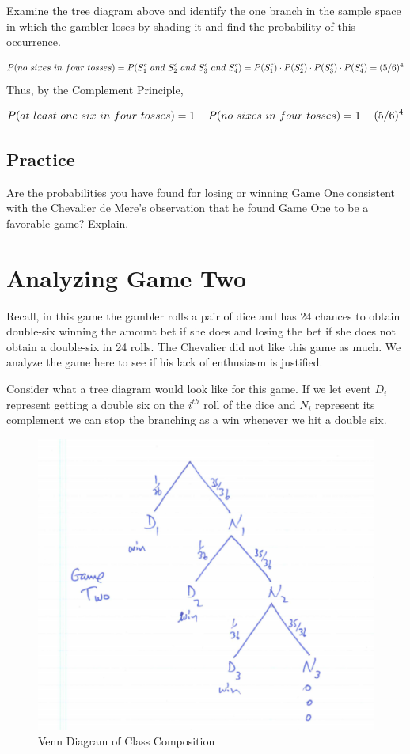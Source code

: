 \documentclass[]{book}
\theoremstyle{definition}
\theoremstyle{definition}
\theoremstyle{definition}
\theoremstyle{remark}
\begin{document}
Examine the tree diagram above and identify the one branch in the sample
space in which the gambler loses by shading it and find the probability
of this occurrence.

\[P(no \ sixes \ in \ four \ tosses)=P(S_{1}^{c} \ and \ S_{2}^{c} \ and \ S_{3}^{c} \ and \ S_{4}^{c}) = \\ P(S_{1}^{c}) \cdot P(S_{2}^{c}) \cdot P(S_{3}^{c}) \cdot P(S_{4}^{c})=(5/6)^{4}\]
Thus, by the Complement Principle,

\[P(at \ least \ one \ six \ in \ four \ tosses) = 1 - P(no \ sixes \ in \ four \ tosses) = \\ 1 - (5/6)^{4}\]

\subsection{Practice}\label{practice-2}

Are the probabilities you have found for losing or winning Game One
consistent with the Chevalier de Mere's observation that he found Game
One to be a favorable game? Explain.

\section{Analyzing Game Two}\label{analyzing_game_two}

Recall, in this game the gambler rolls a pair of dice and has 24 chances
to obtain double-six winning the amount bet if she does and losing the
bet if she does not obtain a double-six in 24 rolls. The Chevalier did
not like this game as much. We analyze the game here to see if his lack
of enthusiasm is justified.

Consider what a tree diagram would look like for this game. If we let
event \(D_{i}\) represent getting a double six on the \(i^{th}\) roll of
the dice and \(N_{i}\) represent its complement we can stop the
branching as a win whenever we hit a double six.

\begin{figure}

{\centering \includegraphics[width=0.3\linewidth]{01-basics-figures/chevalier_game_two} 

}

\caption{Venn Diagram of Class Composition}\label{fig:nice-fig-64}
\end{figure}
\end{document}
